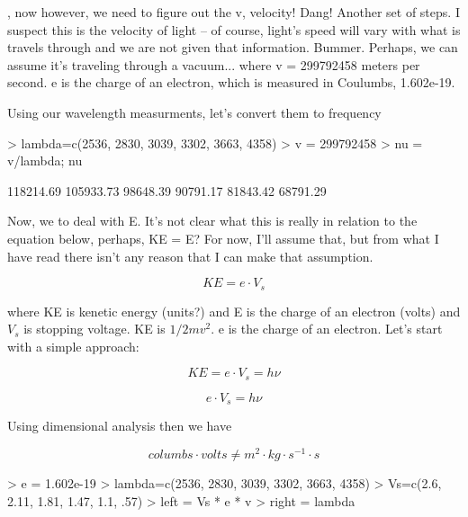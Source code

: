 \documentclass{article}
\begin{document}
\noindent, now however, we need to figure out the v, velocity!  Dang!  Another set of steps. I suspect this is the velocity of light -- of course, light's speed will vary with what is travels through and we are not given that information. Bummer. Perhaps, we can assume it's traveling through a vacuum... where v = 299792458 meters per second. e is the charge of an electron, which is measured in Coulumbs, 1.602e-19. 

Using our wavelength measurments, let's convert them to frequency

\begin{Schunk}
\begin{Sinput}
> lambda=c(2536, 2830, 3039, 3302, 3663, 4358)
> v = 299792458
> nu = v/lambda; nu
\end{Sinput}
\begin{Soutput}
[1] 118214.69 105933.73  98648.39  90791.17  81843.42  68791.29
\end{Soutput}
\end{Schunk}

Now, we to deal with E. It's not clear what this is really in relation to the equation below, perhaps, KE = E? For now, I'll assume that, but from what I have read there isn't any reason that I can make that assumption.

\begin{equation}
KE = e \cdot V_s 
\end{equation}

\noindent where KE is kenetic energy (units?) and E is the charge of an electron (volts) and $V_s$ is stopping voltage. KE is $1/2 mv^2$. e is the charge of an electron. Let's start with a simple approach:

\begin{equation}
KE = e \cdot V_s = h \nu
\end{equation}
 
\begin{equation}
e \cdot V_s  = h \nu
\end{equation}

Using dimensional analysis then we have 

\begin{equation}
columbs \cdot volts \neq m^2 \cdot kg \cdot s^{-1} \cdot s
\end{equation}

\begin{Schunk}
\begin{Sinput}
> e = 1.602e-19
> lambda=c(2536, 2830, 3039, 3302, 3663, 4358)
> Vs=c(2.6, 2.11, 1.81, 1.47, 1.1, .57)
> left = Vs * e * v 
> right = lambda
\end{Sinput}
\end{Schunk}
\end{document}
